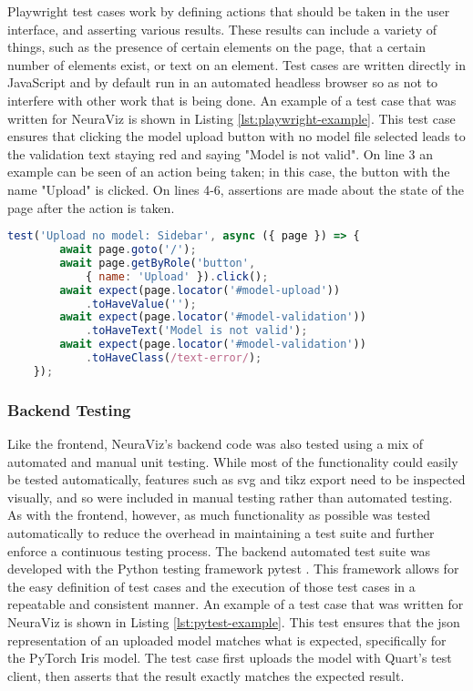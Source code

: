 Playwright test cases work by defining actions that should be taken in the user interface, and asserting various results. These results can include a variety of things, such as the presence of certain elements on the page, that a certain number of elements exist, or text on an element. Test cases are written directly in JavaScript and by default run in an automated headless browser so as not to interfere with other work that is being done. An example of a test case that was written for NeuraViz is shown in Listing \ref{lst:playwright-example}. This test case ensures that clicking the model upload button with no model file selected leads to the validation text staying red and saying "Model is not valid". On line 3 an example can be seen of an action being taken; in this case, the button with the name "Upload" is clicked. On lines 4-6, assertions are made about the state of the page after the action is taken.

\begin{center}
    \begin{lstlisting}[language=JavaScript, float=*htb, caption={Playwright Test Case Example}, label={lst:playwright-example}]
    test('Upload no model: Sidebar', async ({ page }) => {
        await page.goto('/');
        await page.getByRole('button', 
            { name: 'Upload' }).click();
        await expect(page.locator('#model-upload'))
            .toHaveValue('');
        await expect(page.locator('#model-validation'))
            .toHaveText('Model is not valid');
        await expect(page.locator('#model-validation'))
            .toHaveClass(/text-error/);
    });
    \end{lstlisting}
\end{center}

\subsubsection{Backend Testing}
Like the frontend, NeuraViz's backend code was also tested using a mix of automated and manual unit testing. While most of the functionality could easily be tested automatically, features such as svg and tikz export need to be inspected visually, and so were included in manual testing rather than automated testing. As with the frontend, however, as much functionality as possible was tested automatically to reduce the overhead in maintaining a test suite and further enforce a continuous testing process. The backend automated test suite was developed with the Python testing framework pytest \cite{pytest}. This framework allows for the easy definition of test cases and the execution of those test cases in a repeatable and consistent manner. An example of a test case that was written for NeuraViz is shown in Listing \ref{lst:pytest-example}. This test ensures that the json representation of an uploaded model matches what is expected, specifically for the PyTorch Iris model. The test case first uploads the model with Quart's test client, then asserts that the result exactly matches the expected result.

